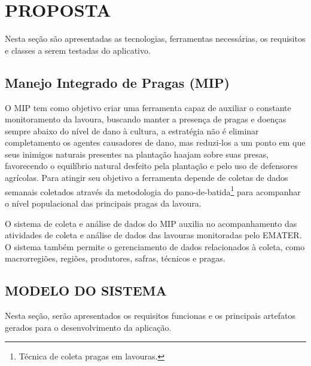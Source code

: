 
\chapter{PROPOSTA}
\label{chap:metodologia}

Nesta seção são apresentadas as tecnologias, ferramentas necessárias, os requisitos e  classes a serem testadas  do aplicativo.

\section{Manejo Integrado de Pragas (MIP)}
        
O MIP tem como objetivo criar uma ferramenta capaz de auxiliar o constante monitoramento da lavoura, buscando manter a presença de pragas e doenças sempre abaixo do nível de dano à cultura, a estratégia não é eliminar completamento os agentes causadores de dano, mas reduzi-los a um ponto em que seus inimigos naturais presentes na plantação haajam sobre suas presas, favorecendo o equilíbrio natural desfeito pela plantação e pelo uso de defensores agrícolas. Para atingir seu objetivo a ferramenta depende de coletas de dados semanais coletados através da metodologia do pano-de-batida\footnote{Técnica de coleta pragas em lavouras.} para acompanhar o nível populacional das principais pragas da lavoura. 


O sistema de coleta e análise de dados do MIP auxilia no acompanhamento das atividades de coleta e análise de dados das lavouras monitoradas pelo EMATER. O sistema também permite o gerenciamento de dados relacionados à coleta, como macrorregiões, regiões, produtores, safras, técnicos e pragas. 




\section{MODELO DO SISTEMA}
Nesta seção, serão apresentados os requisitos funcionas e os principais artefatos gerados para o desenvolvimento da aplicação.

